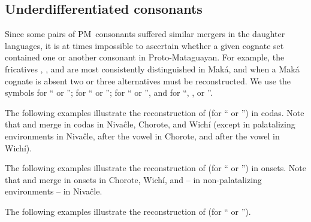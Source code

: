 \subsection{Underdifferentiated consonants}\label{proto-underdif}

Since some pairs of PM~consonants suffered similar mergers in the daughter languages, it is at times impossible to ascertain whether a given cognate set contained one or another consonant in Proto-Mataguayan. For example, the fricatives , , and  are most consistently distinguished in Maká, and when a Maká cognate is absent two or three alternatives must be reconstructed. We use the symbols  for `` or '';  for `` or '';  for `` or '', and  for ``, , or ''.

The following examples illustrate the reconstruction of  (for `` or '') in codas. Note that  and  merge in codas in Nivaĉle, Chorote, and Wichí (except in palatalizing environments in Nivaĉle, after the vowel  in Chorote, and after the vowel  in Wichí).

\begin{exe}
    \ex \pocote
    \ex \chaguark
    \ex \sweat
    \ex \majan
    \ex \orphancw
    \ex \tongue
    \ex \toad
    \ex \precipice
    \ex \metal
    \ex \jaguar
\end{exe}

The following examples illustrate the reconstruction of  (for `` or '') in onsets. Note that  and  merge in onsets in Chorote, Wichí, and -- in non-palatalizing environments -- in Nivaĉle.

\begin{exe}
    \ex \nightmonkey
    \ex \saber
    \ex \gov
    \ex \palosanto
    \ex \nightnw
    \ex \sandyplace
    \ex \firewoodhuk
    \ex \temperance
    \ex \pushv
    \ex \caracara
    \ex \mistolf
    \ex \mistolt
\end{exe}

The following examples illustrate the reconstruction of  (for `` or '').

\begin{exe}
    \ex \nightmonkey
    \ex \girl
    \ex \earth
\end{exe}

